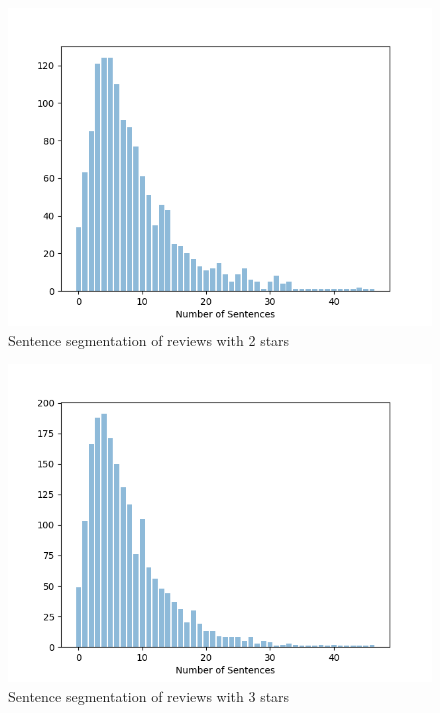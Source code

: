 \documentclass[sigconf]{acmart}
\begin{document}
\begin{figure}[ht]
  \centering
  \includegraphics[width=\linewidth]{segmentation_2star.png}
  \caption{Sentence segmentation of reviews with 2 stars}
  \label{fig:seg_2star}
\end{figure}

\begin{figure}[ht]
  \centering
  \includegraphics[width=\linewidth]{segmentation_3star.png}
  \caption{Sentence segmentation of reviews with 3 stars}
  \label{fig:seg_3star}
\end{figure}
\end{document}
